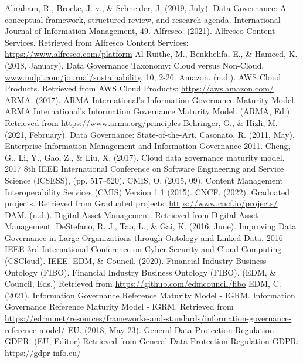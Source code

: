 \documentclass[runningheads]{llncs}
\begin{document}
\begin{thebibliography}{8}
 Abraham, R., Brocke, J. v., \& Schneider, J. (2019, July). Data Governance: A conceptual framework, structured review, and research agenda. International Journal of Information Management, 49. 
 Alfresco. (2021). Alfresco Content Services. Retrieved from Alfresco Content Services: \url{https://www.alfresco.com/platform}
 Al-Ruithe, M., Benkhelifa, E., \& Hameed, K. (2018, January). Data Governance Taxonomy: Cloud versus Non-Cloud. \url{www.mdpi.com/journal/sustainability}, 10, 2-26. 
 Amazon. (n.d.). AWS Cloud Products. Retrieved from AWS Cloud Products: \url{https://aws.amazon.com/}
 ARMA. (2017). ARMA International’s Information Governance Maturity Model. ARMA International’s Information Governance Maturity Model. (ARMA, Ed.) Retrieved from \url{https://www.arma.org/principles}
 Behringer, G., \& Hizli, M. (2021, February). Data Governance: State-of-the-Art.
 Casonato, R. (2011, May). Enterprise Information Management and Information Governance 2011. 
 Cheng, G., Li, Y., Gao, Z., \& Liu, X. (2017). Cloud data governance maturity model. 2017 8th IEEE International Conference on Software Engineering and Service Science (ICSESS), (pp. 517–520). 
 CMIS, O. (2015, 09). Content Management Interoperability Services (CMIS) Version 1.1 (2015).
 CNCF. (2022). Graduated projects. Retrieved from Graduated projects: \url{https://www.cncf.io/projects/}
 DAM. (n.d.). Digital Asset Management. Retrieved from Digital Asset Management.
 DeStefano, R. J., Tao, L., \& Gai, K. (2016, June). Improving Data Governance in Large Organizations through Ontology and Linked Data. 2016 IEEE 3rd International Conference on Cyber Security and Cloud Computing (CSCloud). IEEE. 
 EDM, \& Council. (2020). Financial Industry Business Ontology (FIBO). Financial Industry Business Ontology (FIBO). (EDM, \& Council, Eds.) Retrieved from \url{https://github.com/edmcouncil/fibo}
 EDM, C. (2021). Information Governance Reference Maturity Model - IGRM. Information Governance Reference Maturity Model - IGRM. Retrieved from \url{https://edrm.net/resources/frameworks-and-standards/information-governance-reference-model/}
 EU. (2018, May 23). General Data Protection Regulation GDPR. (EU, Editor) Retrieved from General Data Protection Regulation GDPR: \url{https://gdpr-info.eu/}

\end{thebibliography}
\end{document}

